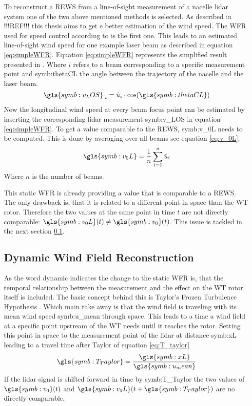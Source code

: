 \noindent To reconstruct a \gls{REWS} from a line-of-sight measurement of a nacelle \gls{lidar} system one of the two above mentioned methods is selected. As described in !!!REF!!! this thesis aims to get e better estimation of the wind speed. The \gls{WFR} used for speed control according to \cite{Schlipf2011} is the first one. This leads to an estimated line-of-sight wind speed for one example laser beam as described in equation \ref{eq:simpleWFR}. Equation \ref{eq:simpleWFR} represents the simplified result presented in \cite{Schlipf2015}. Where $i$ refers to a beam corresponding to a specific measurement point and \gls{symb:thetaCL} the angle between the trajectory of the nacelle and the laser beam. 
\begin{equation}
	\gls{symb:v_LOS}_{,i} =  \hat{u}_i \cdot \cos(\gls{symb:thetaCL})
	\label{eq:simpleWFR}	
\end{equation}
Now the longitudinal wind speed at every beam focus point can be estimated by inserting the corresponding \gls{lidar} measurement \gls{symb:v_LOS} in equation \ref{eq:simpleWFR}. To get a value comparable to the \gls{REWS}, \gls{symb:v_0L} needs to be computed. This is done by averaging over all beams see equation \ref{eq:v_0L}. 
\begin{equation}
	\gls{symb:v_0L} =  \frac{1}{n} \sum_{i=1}^{n} \hat{u}_i
	\label{eq:v_0L}	
\end{equation}  
Where $n$ is the number of beams. 

\noindent This static \gls{WFR} is already providing a value that is comparable to a \gls{REWS}. The only drawback is, that it is related to a different point in space than the \gls{WT} rotor. Therefore the two values at the same point in time $t$ are not directly comparable: $\gls{symb:v_0L}(t) \neq \gls{symb:v_0}(t)$. This issue is tackled in the next section \ref{subsec:DynamicWFR}.    

\subsection{Dynamic Wind Field Reconstruction}\label{subsec:DynamicWFR}
As the word dynamic indicates the change to the static \gls{WFR} is, that the temporal relationship between the measurement and the effect on the \gls{WT} rotor itself is included. The basic concept behind this is Taylor’s Frozen Turbulence Hypothesis \cite{Taylor1938}. Which main take away is that the wind field is traveling with its mean wind speed \gls{symb:u_mean} through space. This leads to a time a wind field at a specific point upstream of the \gls{WT} needs until it reaches the rotor. Setting this point in space to the measurement point of the \gls{lidar} at distance \gls{symb:xL} leading to a travel time after Taylor of equation \ref{eq:T_taylor}
\begin{equation}
	\gls{symb:T_Taylor} =  \frac{\gls{symb:xL}}{\gls{symb:u_mean}} 
	\label{eq:T_taylor}	
\end{equation}
If the \gls{lidar} signal is shifted forward in time by \gls{symb:T_Taylor} the two values of $\gls{symb:v_0}(t)$ and $\gls{symb:v_0L}(t+\gls{symb:T_Taylor})$ are no directly comparable. 

